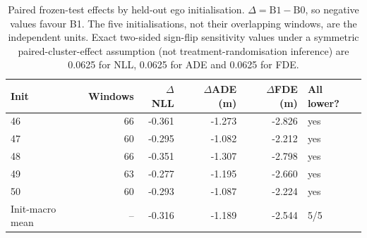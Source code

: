 \begin{table}[t]
\centering\small
\caption{Paired frozen-test effects by held-out ego initialisation. $\Delta=\mathrm{B1}-\mathrm{B0}$, so negative values favour B1. The five initialisations, not their overlapping windows, are the independent units. Exact two-sided sign-flip sensitivity values under a symmetric paired-cluster-effect assumption (not treatment-randomisation inference) are 0.0625 for NLL, 0.0625 for ADE and 0.0625 for FDE.}
\label{tab:finetune-b0-b1-paired-init}
\begin{tabular}{@{}lrrrrl@{}}
\toprule
Init & Windows & $\Delta$NLL & $\Delta$ADE (m) & $\Delta$FDE (m) & All lower? \\
\midrule
46 & 66 & -0.361 & -1.273 & -2.826 & yes \\
47 & 60 & -0.295 & -1.082 & -2.212 & yes \\
48 & 66 & -0.351 & -1.307 & -2.798 & yes \\
49 & 63 & -0.277 & -1.195 & -2.660 & yes \\
50 & 60 & -0.293 & -1.087 & -2.224 & yes \\
\midrule
Init-macro mean & -- & -0.316 & -1.189 & -2.544 & 5/5 \\
\bottomrule
\end{tabular}
\end{table}
